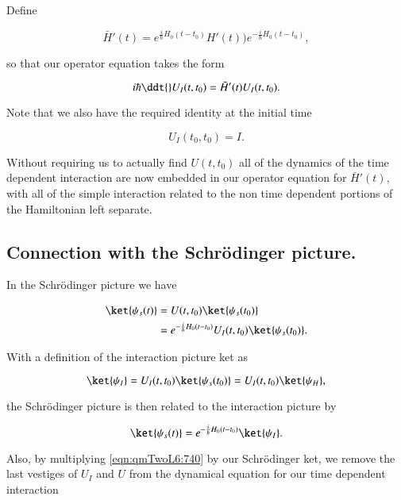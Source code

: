 Define 

\begin{equation}\label{eqn:qmTwoL6:720}
\bar{H}'(t) =
e^{\frac{i}{\hbar} H_0(t - t_0)} H'(t)) e^{-\frac{i}{\hbar} H_0(t - t_0)},
\end{equation}

so that our operator equation takes the form

\begin{equation}\label{eqn:qmTwoL6:740}
i \hbar \ddt{} U_I(t, t_0) = \bar{H}'(t) U_I(t, t_0).
\end{equation}

Note that we also have the required identity at the initial time

\begin{equation}\label{eqn:qmTwoL6:760}
U_I(t_0, t_0) = I.
\end{equation}

Without requiring us to actually find $U(t, t_0)$ all of the dynamics of the time dependent interaction are now embedded in our operator equation for $\bar{H}'(t)$, with all of the simple interaction related to the non time dependent portions of the Hamiltonian left separate.

\subsection{Connection with the Schr\"{o}dinger picture.}

In the Schr\"{o}dinger picture we have

\begin{align*}
\ket{\psi_s(t)} 
&= U(t, t_0) 
\ket{\psi_s(t_0)}  \\
&=
e^{-\frac{i}{\hbar} H_0(t - t_0)} U_I(t, t_0)
\ket{\psi_s(t_0)}.
\end{align*}

With a definition of the interaction picture ket as

\begin{equation}\label{eqn:qmTwoL6:780}
\ket{\psi_I} 
= U_I(t, t_0) \ket{\psi_s(t_0)} = U_I(t, t_0) \ket{\psi_H},
\end{equation}

the Schr\"{o}dinger picture is then related to the interaction picture by

\begin{equation}\label{eqn:qmTwoL6:800}
\ket{\psi_s(t)} = e^{-\frac{i}{\hbar} H_0(t - t_0)} \ket{\psi_I}.
\end{equation}

Also, by multiplying \ref{eqn:qmTwoL6:740} by our Schr\"{o}dinger ket, we remove the last vestiges of $U_I$ and $U$ from the dynamical equation for our time dependent interaction

